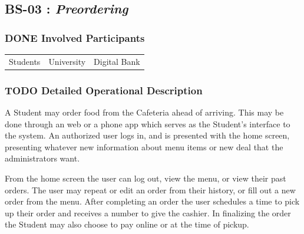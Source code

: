 \documentclass[11pt]{article}
\begin{document}
\subsection{\label{org368ba72}BS-03 : \emph{Preordering}}
\label{sec:orgaf6d8ec}
\subsubsection{{\bfseries\sffamily DONE} Involved Participants}
\label{sec:orga2af069}
\begin{center}
\begin{tabular}{lll}
Students & University & Digital Bank\\
\end{tabular}
\end{center}
\subsubsection{{\bfseries\sffamily TODO} Detailed Operational Description}
\label{sec:orgd6ac445}
A Student may order food from the Cafeteria ahead of
arriving. This may be done through an web or a phone app which
serves as the Student's interface to the system. An authorized
user logs in, and is presented with the home screen, presenting
whatever new information about menu items or new deal that the
administrators want.

From the home screen the user can log out, view the menu, or view
their past orders. The user may repeat or edit an order from
their history, or fill out a new order from the menu. After
completing an order the user schedules a time to pick up their
order and receives a number to give the cashier. In finalizing the
order the Student may also choose to pay online or at the time of
pickup.
\end{document}
